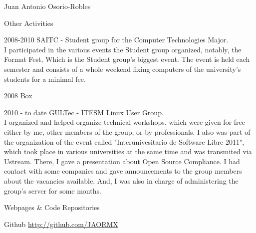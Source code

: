 \documentclass[spanish,10pt,letterpaper]{article}
\begin{document}
\begin{cv}{Juan Antonio Osorio-Robles}
	\begin{cvlist}{Other Activities}
		\item [2008-2010] SAITC - Student group for the Computer Technologies Major.\\
			I participated in the various events the Student group organized, notably, the Format Fest, Which is the Student group's biggest event. The event is held each semester and consists of a whole weekend fixing computers of the university's students for a minimal fee.
		\item [2008] Box
		\item [2010 - to date] GULTec - ITESM Linux User Group.\\
			I organized and helped organize technical workshops, which were given for free either by me, other members of the group, or by professionals. I also was part of the organization of the event called "Interunivesitario de Software Libre 2011", which took place in various universities at the same time and was transmited via Ustream. There, I gave a presentation about Open Source Compliance. I had contact with some companies and gave announcements to the group members about the vacancies available. And, I was also in charge of administering the group's server for some months.
	\end{cvlist}

	\begin{cvlist}{Webpages \& Code Repositories}
		\item [Github] \href{http://github.com/JAORMX}{http://github.com/JAORMX}
	\end{cvlist}



\end{cv}


\end{document}
